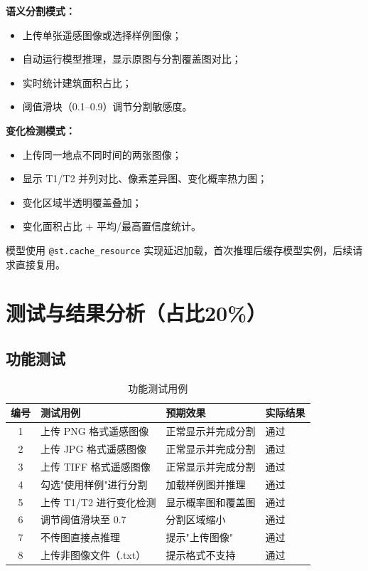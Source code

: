 \documentclass[12pt,a4paper]{article}
\begin{document}
\textbf{语义分割模式：}
\begin{itemize}
    \item 上传单张遥感图像或选择样例图像；
    \item 自动运行模型推理，显示原图与分割覆盖图对比；
    \item 实时统计建筑面积占比；
    \item 阈值滑块（0.1--0.9）调节分割敏感度。
\end{itemize}

\textbf{变化检测模式：}
\begin{itemize}
    \item 上传同一地点不同时间的两张图像；
    \item 显示 T1/T2 并列对比、像素差异图、变化概率热力图；
    \item 变化区域半透明覆盖叠加；
    \item 变化面积占比 + 平均/最高置信度统计。
\end{itemize}

模型使用 \lstinline{@st.cache_resource} 实现延迟加载，首次推理后缓存模型实例，后续请求直接复用。

\section{测试与结果分析（占比20\%）}

\subsection{功能测试}

\begin{table}[H]
\centering
\caption{功能测试用例}
\label{tab:ft}
\begin{tabular}{clll}
\toprule
编号 & 测试用例 & 预期效果 & 实际结果 \\
\midrule
1 & 上传 PNG 格式遥感图像 & 正常显示并完成分割 & 通过 \\
2 & 上传 JPG 格式遥感图像 & 正常显示并完成分割 & 通过 \\
3 & 上传 TIFF 格式遥感图像 & 正常显示并完成分割 & 通过 \\
4 & 勾选"使用样例"进行分割 & 加载样例图并推理 & 通过 \\
5 & 上传 T1/T2 进行变化检测 & 显示概率图和覆盖图 & 通过 \\
6 & 调节阈值滑块至 0.7 & 分割区域缩小 & 通过 \\
7 & 不传图直接点推理 & 提示"上传图像" & 通过 \\
8 & 上传非图像文件（.txt） & 提示格式不支持 & 通过 \\
\bottomrule
\end{tabular}
\end{table}
\end{document}
